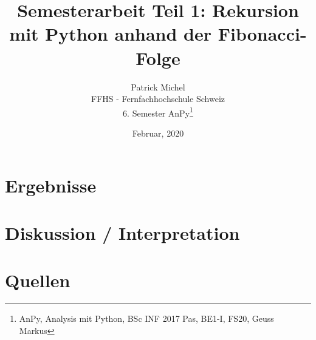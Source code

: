 \documentclass[12pt]{article}
\title{Semesterarbeit Teil 1: Rekursion mit Python anhand der Fibonacci-Folge}
\date{Februar, 2020}
\author{Patrick Michel\\
FFHS - Fernfachhochschule Schweiz\\
6. Semester AnPy\thanks{AnPy, Analysis mit Python, BSc INF 2017 Pas, BE1-I, FS20, Geuss Markus}
}
\begin{document}

\begin{titlepage}

\maketitle
\tableofcontents

\end{titlepage}



\newpage



\newpage



\newpage

\section{Ergebnisse}
\blindtext

\section{Diskussion / Interpretation}
\blindtext

\section{Quellen}
\blindtext
\end{document}
